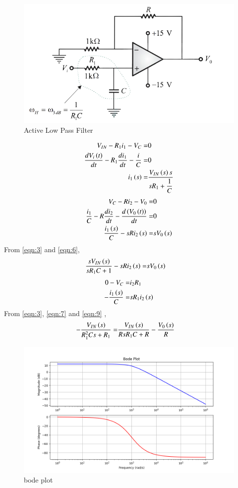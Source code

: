 \documentclass[journal,12pt,twocolumn]{IEEEtran}
\theoremstyle{remark}
\begin{document}
\begin{figure}[ht]
	\centering
    \includegraphics[width=\columnwidth]{figs/fig2.png}
    \caption{Active Low Pass Filter}
    \label{fig: 1}
\end{figure}
\begin{align}
V_{IN} - R_1i_1 - V_C =& 0\\
\dfrac{dV_i\left(t\right)}{dt} - R_1\dfrac{di_1}{dt} -\dfrac{i}{C} =& 0 \\
\label{eqn:3}i_1\left(s\right)=& \dfrac{V_{IN}\left(s\right)s}{sR_1 +\dfrac{1}{C}}
\end{align}
\begin{align}
V_C - R i_2 -V_0 =& 0\\
\dfrac{i_1}{C} - R \dfrac{di_2}{dt} - \dfrac{d\left(V_0\left(t\right)\right)}{dt} =& 0\\
\label{eqn:6}\dfrac{i_1\left(s\right)}{C} - sRi_2\left(s\right) =& sV_0\left(s\right)
\end{align}
From \eqref{eqn:3} and \eqref{eqn:6},
\begin{align}
\label{eqn:7} \dfrac{sV_{IN}\left(s\right)}{sR_1 C+1} - sRi_2\left(s\right) =& sV_0\left(s\right)
\end{align}
\begin{align}
0- V_C =&i_2 R_1 \\
\label{eqn:9} -\dfrac{i_1\left(s\right)}{C}=& sR_1i_2\left(s\right)
\end{align}
From \eqref{eqn:3}, \eqref{eqn:7} and \eqref{eqn:9} ,
\begin{align}
-\dfrac{V_{IN}\left(s\right)}{R_{1}^2Cs + R_1} =& \dfrac{V_{IN}\left(s\right)}{RsR_1C + R} - \dfrac{V_0\left(s\right)}{R}
\end{align}
\begin{figure}[ht]
	\centering
    \includegraphics[width=\columnwidth]{figs/fig5.png}
    \caption{bode plot}
    \label{fig: 2}
\end{figure}
\end{document}
